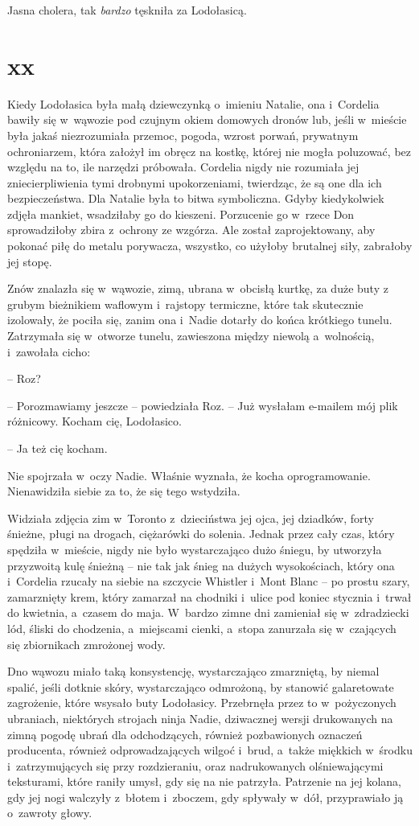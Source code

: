 \documentclass[oneside,polish,11pt,sfheadings]{mwbk}
\begin{document}
Jasna cholera, tak \textit{bardzo} tęskniła za Lodołasicą.

\chapter*{xx}
Kiedy Lodołasica była małą dziewczynką o~imieniu Natalie, ona i~Cordelia
bawiły się w~wąwozie pod czujnym okiem domowych dronów lub, jeśli w~mieście była jakaś niezrozumiała przemoc, pogoda, wzrost porwań,
prywatnym ochroniarzem, która założył im obręcz na kostkę, której nie
mogła poluzować, bez względu na to, ile narzędzi próbowała. Cordelia
nigdy nie rozumiała jej zniecierpliwienia tymi drobnymi upokorzeniami,
twierdząc, że są one dla ich bezpieczeństwa. Dla Natalie była to bitwa
symboliczna. Gdyby kiedykolwiek zdjęła mankiet, wsadziłaby go do
kieszeni. Porzucenie go w~rzece Don sprowadziłoby zbira z~ochrony ze
wzgórza. Ale został zaprojektowany, aby pokonać piłę do metalu
porywacza, wszystko, co użyłoby brutalnej siły, zabrałoby jej stopę.

Znów znalazła się w~wąwozie, zimą, ubrana w~obcisłą kurtkę, za duże buty
z grubym bieżnikiem waflowym i~rajstopy termiczne, które tak skutecznie
izolowały, że pociła się, zanim ona i~Nadie dotarły do końca krótkiego
tunelu. Zatrzymała się w~otworze tunelu, zawieszona między niewolą a~wolnością, i~zawołała cicho: 

-- Roz?

-- Porozmawiamy jeszcze -- powiedziała Roz. -- Już wysłałam e-mailem mój
plik różnicowy. Kocham cię, Lodołasico.

-- Ja też cię kocham.

Nie spojrzała w~oczy Nadie. Właśnie wyznała, że kocha oprogramowanie.
Nienawidziła siebie za to, że się tego wstydziła.

Widziała zdjęcia zim w~Toronto z~dzieciństwa jej ojca, jej dziadków,
forty śnieżne, pługi na drogach, ciężarówki do solenia. Jednak przez
cały czas, który spędziła w~mieście, nigdy nie było wystarczająco dużo
śniegu, by utworzyła przyzwoitą kulę śnieżną -- nie tak jak śnieg na
dużych wysokościach, który ona i~Cordelia rzucały na siebie na szczycie
Whistler i~Mont Blanc -- po prostu szary, zamarznięty krem, który
zamarzał na chodniki i~ulice pod koniec stycznia i~trwał do kwietnia, a~czasem do maja. W~bardzo zimne dni zamieniał się w~zdradziecki lód,
śliski do chodzenia, a~miejscami cienki, a~stopa zanurzała się w~czających się zbiornikach zmrożonej wody.

Dno wąwozu miało taką konsystencję, wystarczająco zmarzniętą, by niemal
spalić, jeśli dotknie skóry, wystarczająco odmrożoną, by stanowić
galaretowate zagrożenie, które wsysało buty Lodołasicy. Przebrnęła przez
to w~pożyczonych ubraniach, niektórych strojach ninja Nadie, dziwacznej
wersji drukowanych na zimną pogodę ubrań dla odchodzących, również
pozbawionych oznaczeń producenta, również odprowadzających wilgoć i~brud, a~także miękkich w~środku i~zatrzymujących się przy rozdzieraniu,
oraz nadrukowanych olśniewającymi teksturami, które raniły umysł, gdy
się na nie patrzyła. Patrzenie na jej kolana, gdy jej nogi walczyły z~błotem i~zboczem, gdy spływały w~dół, przyprawiało ją o~zawroty głowy.
\end{document}
